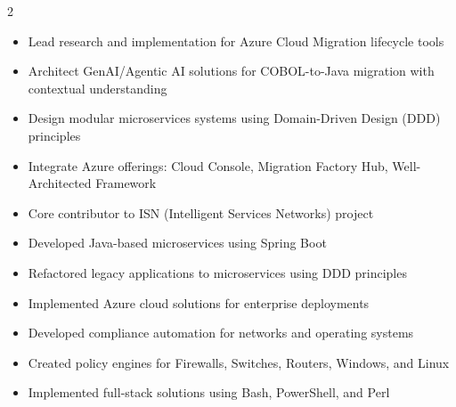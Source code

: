 \documentclass[10pt,a4paper,ragged2e,withhyper]{altacv}
\begin{document}
\makecvheader%

\begin{paracol}{2}

\begin{itemize}
\item Lead research and implementation for Azure Cloud Migration lifecycle tools
\item Architect GenAI/Agentic AI solutions for COBOL-to-Java migration with contextual understanding
\item Design modular microservices systems using Domain-Driven Design (DDD) principles
\item Integrate Azure offerings: Cloud Console, Migration Factory Hub, Well-Architected Framework
\end{itemize}
\divider%

\begin{itemize}
\item Core contributor to ISN (Intelligent Services Networks) project
\item Developed Java-based microservices using Spring Boot
\item Refactored legacy applications to microservices using DDD principles
\item Implemented Azure cloud solutions for enterprise deployments
\end{itemize}
\divider%

\begin{itemize}
\item Developed compliance automation for networks and operating systems
\item Created policy engines for Firewalls, Switches, Routers, Windows, and Linux
\item Implemented full-stack solutions using Bash, PowerShell, and Perl
\end{itemize}
\divider%


\end{paracol}
\end{document}
